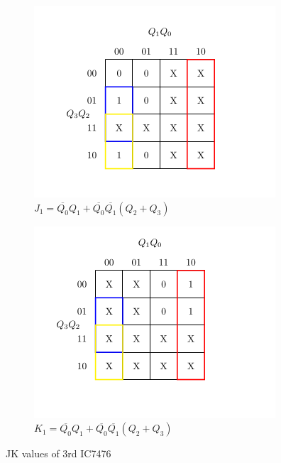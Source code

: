 \documentclass[a4paper,12pt]{article}
\begin{document}
\begin{figure}[H]
    \vspace{0.5cm}

    \begin{subfigure}[b]{0.45\textwidth}
        \centering
        \includegraphics[width=\linewidth]{dec/dj1.png}
        \caption{$J_1=\overline{Q_0}Q_1+\overline{Q_0}\overline{Q_1}(Q_2+Q_3)$}
    \end{subfigure}
    \hfill
    \begin{subfigure}[b]{0.45\textwidth}
        \centering
        \includegraphics[width=\linewidth]{dec/dk1.png}
        \caption{$K_1=\overline{Q_0}Q_1+\overline{Q_0}\overline{Q_1}(Q_2+Q_3)$}
    \end{subfigure}

    \caption{JK values of 3rd IC7476}
\end{figure}
\end{document}
